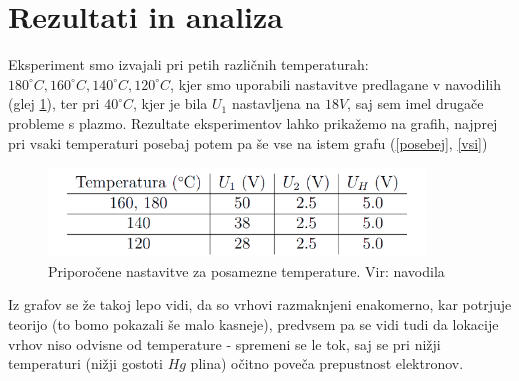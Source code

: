 \documentclass[10pt]{article}
\begin{document}
\section{Rezultati in analiza}

Eksperiment smo izvajali pri petih različnih temperaturah: $180^{\circ}C, 160^{\circ}C, 140^{\circ}C, 120^{\circ}C$, kjer smo uporabili nastavitve predlagane v navodilih (glej \ref{nastavitve}), ter pri $40^{\circ}C$, kjer je bila $U_1$ nastavljena na $18V$, saj sem imel drugače probleme s plazmo. Rezultate eksperimentov lahko prikažemo na grafih, najprej pri vsaki temperaturi posebaj potem pa še vse na istem grafu (\ref{posebej}, \ref{vsi})

\begin{figure}[h]
    \begin{center}
        \includegraphics[width=10cm]{nastavitve.png}
        \caption{Priporočene nastavitve za posamezne temperature. Vir: navodila}
        \label{nastavitve}
    \end{center}
\end{figure}

Iz grafov se že takoj lepo vidi, da so vrhovi razmaknjeni enakomerno, kar potrjuje teorijo (to bomo pokazali še malo kasneje), predvsem pa se vidi tudi da lokacije vrhov niso odvisne od temperature - spremeni se le tok, saj se pri nižji temperaturi (nižji gostoti $Hg$ plina) očitno poveča prepustnost elektronov.
\end{document}
